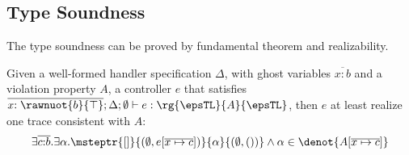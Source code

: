 \subsection{Type Soundness} 

The type soundness can be proved by fundamental theorem and realizability.

\begin{theorem}\label{theorem:sound-ap} Given
  a well-formed handler specification $\Delta$, with ghost variables $\overline{x{:}b}$ and a violation property $A$, a controller $e$ that satisfies
  $\overline{x{:\rawnuot{b}{\top}}};\Delta; \emptyset \vdash e : \rg{\epsTL}{A}{\epsTL}$, then $e$ at least realize one trace consistent with $A$:
 {\footnotesize\begin{align*} \exists
    \overline{c{:}b}. \exists \alpha. \msteptr{[]}{(\emptyset,
      e[\overline{x\mapsto c}])}{\alpha}{(\emptyset, ())} \land \alpha \in
    \denot{A[\overline{x\mapsto c}]}
\end{align*}}
\end{theorem}
